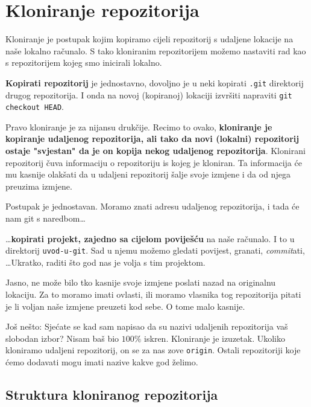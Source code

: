 \section*{Kloniranje repozitorija}

Kloniranje je postupak kojim kopiramo cijeli repozitorij s udaljene lokacije na naše lokalno računalo.
S tako kloniranim repozitorijem možemo nastaviti rad kao s repozitorijem kojeg smo inicirali lokalno.

\textbf{Kopirati repozitorij} je jednostavno, dovoljno je u neki kopirati \verb+.git+ direktorij drugog repozitorija.
I onda na novoj (kopiranoj) lokaciji izvršiti napraviti \verb+git checkout HEAD+.

Pravo kloniranje je za nijansu drukčije.
Recimo to ovako, \textbf{kloniranje je kopiranje udaljenog repozitorija, ali tako da novi (lokalni) repozitorij ostaje "svjestan" da je on kopija nekog udaljenog repozitorija}.
Klonirani repozitorij čuva informaciju o repozitoriju is kojeg je kloniran.
Ta informacija će mu kasnije olakšati da u udaljeni repozitorij šalje svoje izmjene i da od njega preuzima izmjene.

Postupak je jednostavan. Moramo znati adresu udaljenog repozitorija, i tada će nam git s naredbom\dots



\dots{}\textbf{kopirati projekt, zajedno sa cijelom poviješću} na naše računalo.
I to u direktorij \verb+uvod-u-git+.
Sad u njemu možemo gledati povijest, granati, \emph{commit}ati, \dots Ukratko, raditi što god nas je volja s tim projektom.

Jasno, ne može bilo tko kasnije svoje izmjene poslati nazad na originalnu lokaciju. 
Za to moramo imati ovlasti, ili moramo vlasnika tog repozitorija pitati je li voljan naše izmjene preuzeti kod sebe.
O tome malo kasnije.

Još nešto: Sjećate se kad sam napisao da su nazivi udaljenih repozitorija vaš slobodan izbor?
Nisam baš bio $100\%$ iskren. 
Kloniranje je izuzetak.
Ukoliko kloniramo udaljeni repozitorij, on se za nas zove \verb+origin+.
Ostali repozitoriji koje ćemo dodavati mogu imati nazive kakve god želimo.

\subsection*{Struktura kloniranog repozitorija}

